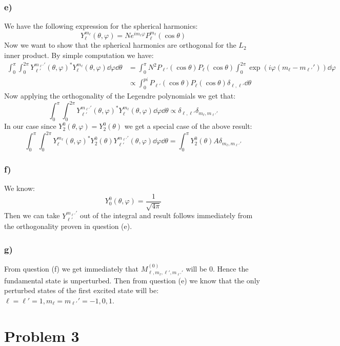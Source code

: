 \documentclass[10pt,a4paper]{book}
\begin{document}
\subsubsection*{e)}
We have the following expression for the spherical harmonics:
\[
Y_\ell^{m_\ell} (\theta, \varphi) = N e^{i m_\ell \varphi } P_\ell^{m_\ell} (\cos \theta) 
\]
Now we want to show that the spherical harmonics are orthogonal for the $L_2$ inner product. By simple computation we have:
\begin{align*}
\int_0^\pi \int_0^{2\pi} Y_{\ell'}^{m_{\ell'}'}(\theta,\varphi)^* Y_{\ell}^{m_\ell} (\theta, \varphi) \dd \varphi \dd \theta &= \int_0^{\pi} N^2 P_{\ell'}(\cos \theta) P_\ell (\cos \theta) \int_0^{2\pi} \exp(i \varphi(m_\ell - m_{\ell'}')) \dd \varphi \\
&\propto \int_0^{pi} P_{\ell'}(\cos \theta) P_\ell (\cos\theta) \delta_{\ell, \ell'} \dd \theta 
\end{align*}
Now applying the orthogonality of the Legendre polynomials we get that:
\[
\int_0^\pi \int_0^{2\pi} Y_{\ell'}^{m_{\ell'}'}(\theta,\varphi)^* Y_{\ell}^{m_\ell} (\theta, \varphi) \dd \varphi \dd \theta \propto \delta_{\ell, \ell'} \delta_{m_\ell, m_{\ell'}'}
\]
In our case since $Y_{2}^0(\theta, \varphi) = Y_2^0(\theta)$ we get a special case of the above result:
\[
\int_{0}^\pi \int_0^{2\pi} Y_{\ell}^{m_\ell}(\theta, \varphi)^* Y_2^0 (\theta) Y_{\ell'}^{m_{\ell'}'}(\theta, \varphi) \dd \varphi \dd \theta = \int_0^{\pi} Y_2^0(\theta) A \delta_{m_\ell, m_{\ell'}'}
\]

\subsubsection*{f)}
We know:
\[
Y_0^0(\theta, \varphi) = \frac{1}{\sqrt{4 \pi}}
\]
Then we can take $Y_{\ell'}^{m_{\ell'}'}$ out of the integral and result follows immediately from the orthogonality proven in question (e).


\subsubsection*{g)}
From question (f) we get immediately that $M^{(0)}_{\ell, m_\ell, \ell', m_{\ell'}'}$ will be 0. Hence the fundamental state is unperturbed. Then from question (e) we know that the only perturbed states of the first excited state will be: $\ell = \ell' = 1, m_\ell = m_{\ell'}' = -1, 0, 1$.


\section*{Problem 3}
\end{document}
